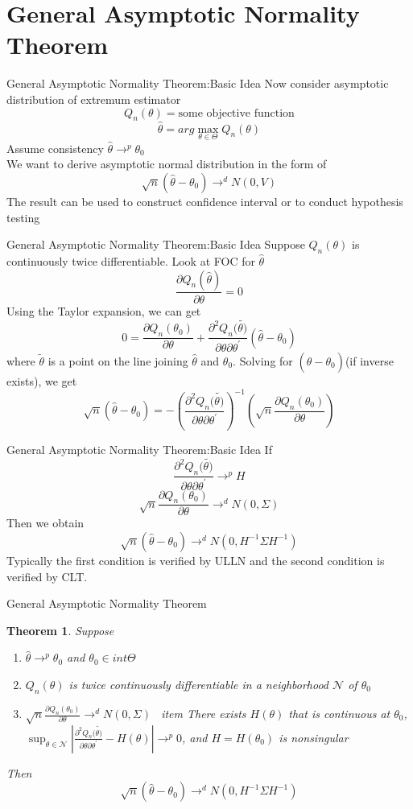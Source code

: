 \documentclass{beamer}
\newtheorem{thm}{Theorem}[subsection]
\begin{document}
\section{General Asymptotic Normality Theorem}
\begin{frame}{General Asymptotic Normality Theorem:Basic Idea}
	Now consider asymptotic distribution of extremum estimator
	\[Q_n(\theta) = \text{some objective function}\]
	\[\hat{\theta} = arg \max_{\theta \in \Theta} Q_n(\theta)\]
	Assume consistency $\hat{\theta} \rightarrow^p \theta_0$ \\
	We want to derive asymptotic normal distribution in the form of 
	\[\sqrt{n} (\hat{\theta} - \theta_0) \rightarrow^d N(0,V)\] 
	The result can be used to construct confidence interval or to conduct hypothesis testing
\end{frame}
\begin{frame}{General Asymptotic Normality Theorem:Basic Idea}
Suppose $Q_n(\theta)$ is continuously twice differentiable. Look at FOC for $\hat{\theta}$
\[\frac{\partial Q_n(\hat{\theta})}{\partial \theta} = 0\]
	Using the Taylor expansion, we can get 
	\[0 = \frac{\partial Q_n(\theta_0)}{\partial \theta} + \frac{\partial^2 Q_n(\tilde{\theta)}}{\partial \theta \partial \theta^{'}}(\hat{\theta} - \theta_0)\]
	where $\tilde{\theta}$ is a point on the line joining $\hat{\theta}$ and $\theta_0$. Solving for $(\hat{\theta} - \theta_0)$(if inverse exists), we get
	\[\sqrt{n} (\hat{\theta} - \theta_0) = - (\frac{\partial^2 Q_n(\tilde{\theta)}}{\partial\theta \partial \theta^{'}})^{-1} (\sqrt{n} \frac{\partial Q_n(\theta_0)}{\partial \theta})\]
\end{frame}
\begin{frame}{General Asymptotic Normality Theorem:Basic Idea}
	If 
	\[\frac{\partial^2 Q_n(\tilde{\theta)}}{\partial\theta \partial \theta^{'}} \rightarrow^p H\]
	\[\sqrt{n} \frac{\partial Q_n(\theta_0)}{\partial \theta} \rightarrow^d N(0,\Sigma)\]
	Then we obtain
	\[\sqrt{n} (\hat{\theta} - \theta_0) \rightarrow^d N(0,H^{-1}\Sigma H^{-1})\]
	Typically the first condition is verified by ULLN and the second condition is verified by CLT.
\end{frame}
\begin{frame}{General Asymptotic Normality Theorem}
	\begin{thm}
		Suppose
		\begin{enumerate}
			\item $\hat{\theta} \rightarrow^p \theta_0$ and $\theta_0 \in int\Theta$
			 \item $Q_n(\theta)$ is twice continuously differentiable in a neighborhood $\mathcal{N}$ of $\theta_0$
			\item $\sqrt{n} \frac{\partial Q_n(\theta_0)}{\partial \theta} \rightarrow^d N(0,\Sigma)$
			\ item There exists $H(\theta)$ that is continuous at $\theta_0$, $\sup_{\theta \in \mathcal{N}} |\frac{\partial^2 Q_n(\tilde{\theta)}}{\partial\theta \partial \theta^{'}} - H(\theta)| \rightarrow^p 0$, and $H = H(\theta_0)$ is nonsingular
		\end{enumerate}
		Then
		\[\sqrt{n}(\hat{\theta} - \theta_0) \rightarrow^d N(0,H^{-1} \Sigma H^{-1})\]
	\end{thm}
\end{frame}
\end{document}
